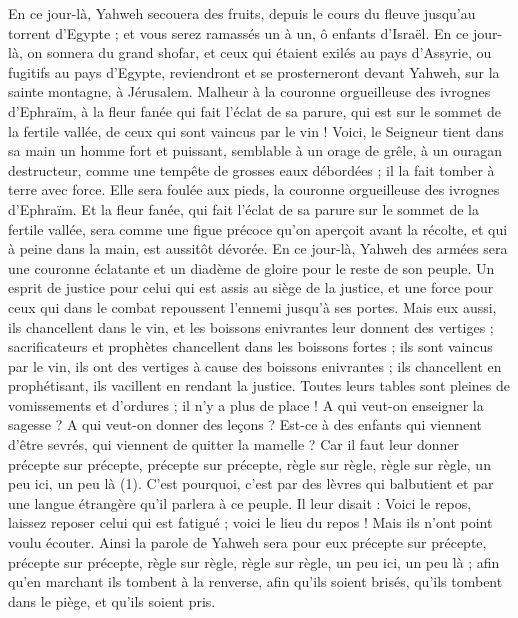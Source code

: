 \begin{multicols}{2}
{En ce jour-là, Yahweh secouera des fruits, depuis le cours du fleuve jusqu'au torrent d'Egypte ; et vous serez ramassés un à un, ô enfants d'Israël.
En ce jour-là, on sonnera du grand shofar, et ceux qui étaient exilés au pays d'Assyrie, ou fugitifs au pays d'Egypte, reviendront et se prosterneront devant Yahweh, sur la sainte montagne, à Jérusalem.
\VerseOne{}Malheur à la couronne orgueilleuse des ivrognes d'Ephraïm, à la fleur fanée qui fait l’éclat de sa parure, qui est sur le sommet de la fertile vallée, de ceux qui sont vaincus par le vin !
Voici, le Seigneur tient dans sa main un homme fort et puissant, semblable à un orage de grêle, à un ouragan destructeur, comme une tempête de grosses eaux débordées ; il la fait tomber à terre avec force.
Elle sera foulée aux pieds, la couronne orgueilleuse des ivrognes d'Ephraïm.
Et la fleur fanée, qui fait l’éclat de sa parure sur le sommet de la fertile vallée, sera comme une figue précoce qu’on aperçoit avant la récolte, et qui à peine dans la main, est aussitôt dévorée.
En ce jour-là, Yahweh des armées sera une couronne éclatante et un diadème de gloire pour le reste de son peuple.
Un esprit de justice pour celui qui est assis au siège de la justice, et une force pour ceux qui dans le combat repoussent l’ennemi jusqu’à ses portes.
Mais eux aussi, ils chancellent dans le vin, et les boissons enivrantes leur donnent des vertiges ; sacrificateurs et prophètes chancellent dans les boissons fortes ; ils sont vaincus par le vin, ils ont des vertiges à cause des boissons enivrantes ; ils chancellent en prophétisant, ils vacillent en rendant la justice.
Toutes leurs tables sont pleines de vomissements et d’ordures ; il n'y a plus de place !
A qui veut-on enseigner la sagesse ? A qui veut-on donner des leçons ? Est-ce à des enfants qui viennent d’être sevrés, qui viennent de quitter la mamelle ?
Car il faut leur donner précepte sur précepte, précepte sur précepte, règle sur règle, règle sur règle, un peu ici, un peu là (1).
C'est pourquoi, c’est par des lèvres qui balbutient et par une langue étrangère qu’il parlera à ce peuple.
Il leur disait : Voici le repos, laissez reposer celui qui est fatigué ; voici le lieu du repos ! Mais ils n'ont point voulu écouter.
Ainsi la parole de Yahweh sera pour eux précepte sur précepte, précepte sur précepte, règle sur règle, règle sur règle, un peu ici, un peu là ; afin qu’en marchant ils tombent à la renverse, afin qu'ils soient brisés, qu'ils tombent dans le piège, et qu'ils soient pris.
}
\end{multicols}
